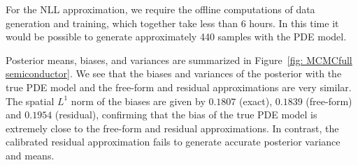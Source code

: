 \documentclass{amsart}
\theoremstyle{definition}
\begin{document}
For the NLL approximation, we require the offline computations of data generation and training, which together take less than 6 hours. In this time it would be possible to generate approximately 440 samples with the PDE model.

Posterior means, biases, and variances are summarized in Figure~\ref{fig: MCMCfull semiconductor}. We see that the biases and variances of the posterior with the true PDE model and the free-form and residual approximations are very similar. The spatial $L^1$ norm of the biases are given by $0.1807$ (exact), $0.1839$ (free-form) and $0.1954$ (residual), confirming that the bias of the true PDE model is extremely close to the free-form and residual approximations. In contrast, the calibrated residual approximation fails to generate accurate posterior variance and means.
\end{document}
